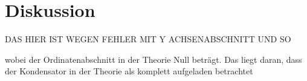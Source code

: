 \section{Diskussion}
\label{sec:Diskussion}
DAS HIER IST WEGEN FEHLER MIT Y ACHSENABSCHNITT UND SO

wobei der Ordinatenabschnitt
in der Theorie Null beträgt. Das liegt daran, dass der Kondensator in der Theorie
als komplett aufgeladen betrachtet
